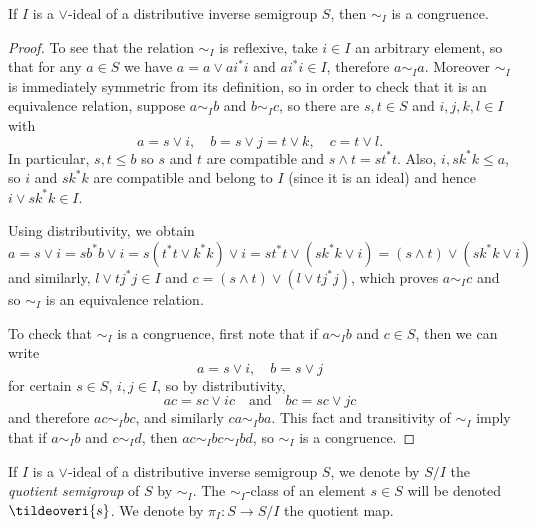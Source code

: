 \begin{theorem}
If $I$ is a $\lor$-ideal of a distributive inverse semigroup $S$, then $\sim_I$ is a congruence.
\end{theorem}
\begin{proof}
To see that the relation $\sim_I$ is reflexive, take $i\in I$ an arbitrary element, so that for any $a\in S$ we have $a=a\lor ai^*i$ and $ai^*i\in I$, therefore $a\sim_I a$. Moreover $\sim_I$ is immediately symmetric from its definition, so in order to check that it is an equivalence relation, suppose $a\sim_I b$ and $b\sim_I c$, so there are $s,t\in S$ and $i,j,k,l\in I$ with
\[a=s\lor i,\quad b=s\lor j=t\lor k,\quad c=t\lor l.\]
In particular, $s,t\leq b$ so $s$ and $t$ are compatible and $s\land t=st^*t$. Also, $i,sk^*k\leq a$, so $i$ and $sk^*k$ are compatible and belong to $I$ (since it is an ideal) and hence $i\lor sk^*k\in I$.

Using distributivity, we obtain
\[a=s\lor i=sb^*b\lor i=s(t^*t\lor k^*k)\lor i=st^*t\lor(sk^*k\lor i)=(s\land t)\lor(sk^*k\lor i)\]
and similarly, $l\lor tj^*j\in I$ and $c=(s\land t)\lor(l\lor tj^*j)$, which proves $a\sim_I c$ and so $\sim_I$ is an equivalence relation.

To check that $\sim_I$ is a congruence, first note that if $a\sim_I b$ and $c\in S$, then we can write
\[a=s\lor i,\quad b=s\lor j\]
for certain $s\in S$, $i,j\in I$, so by distributivity,
\[ac=sc\lor ic\quad\text{and}\quad bc=sc\lor jc\]
and therefore $ac\sim_I bc$, and similarly $ca\sim_I ba$. This fact and transitivity of $\sim_I$ imply that if $a\sim_I b$ and $c\sim_I d$, then $ac\sim_I bc\sim_I bd$, so $\sim_I$ is a congruence.\qedhere
\end{proof}

\begin{definition}
If $I$ is a $\lor$-ideal of a distributive inverse semigroup $S$, we denote by $S/I$ the \emph{quotient semigroup} of $S$ by $\sim_I$. The $\sim_I$-class of an element $s\in S$ will be denoted $\tildeoveri{s}$. We denote by $\pi_I:S\to S/I$ the quotient map.
\end{definition}

